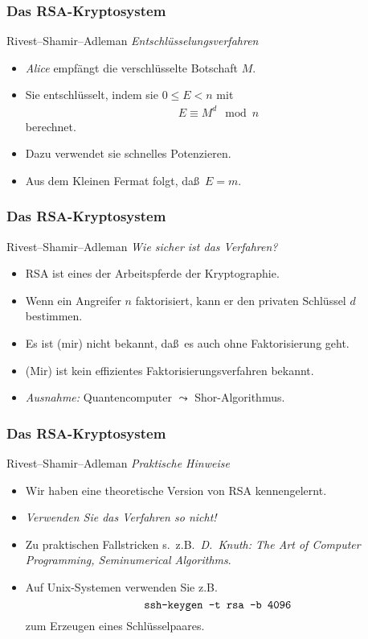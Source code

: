 \documentclass{beamer}
\renewcommand{\emph}[1]{{\textcolor{solarizedRed}{\itshape #1}}}
\renewcommand{\ae}{\"a}
\newcommand{\ue}{\"u}
\newcommand{\mytitle}{Das RSA-Kryptosystem}
\begin{document}
\begin{frame}\frametitle{\mytitle}
	\begin{block}{Rivest--Shamir--Adleman}
		{\itshape Entschl\ue sselungsverfahren}
		\begin{itemize}
			\item \emph{Alice} empf\ae ngt die verschl\ue sselte Botschaft $M$.
			\item Sie entschl\ue sselt, indem sie $0\leq E<n$ mit
				\begin{align*}
				E\equiv M^d\mod n
				\end{align*}
				berechnet.
			\item Dazu verwendet sie schnelles Potenzieren.
			\item Aus dem \alert{Kleinen Fermat} folgt, da\ss\ $E=m$.
		\end{itemize}
	\end{block}
\end{frame}

\begin{frame}\frametitle{\mytitle}
	\begin{block}{Rivest--Shamir--Adleman}
		{\itshape Wie sicher ist das Verfahren?}
		\begin{itemize}
			\item RSA ist eines der Arbeitspferde der Kryptographie.
			\item Wenn ein Angreifer $n$ faktorisiert, kann er den privaten Schl\ue ssel $d$ bestimmen.
			\item Es ist (mir) nicht bekannt, da\ss\ es auch ohne Faktorisierung geht.
			\item (Mir) ist kein effizientes Faktorisierungsverfahren bekannt.
			\item \emph{Ausnahme:} Quantencomputer $\leadsto$ Shor-Algorithmus.
		\end{itemize}
	\end{block}
\end{frame}

\begin{frame}\frametitle{\mytitle}
	\begin{block}{Rivest--Shamir--Adleman}
		{\itshape Praktische Hinweise}
		\begin{itemize}
			\item Wir haben eine theoretische Version von RSA kennengelernt.
			\item \emph{Verwenden Sie das Verfahren so nicht!}
			\item Zu praktischen Fallstricken s.\ z.B.\ {\itshape D.~Knuth: The Art of Computer Programming, Seminumerical Algorithms}.
			\item Auf Unix-Systemen verwenden Sie z.B.\ $$\mbox{\tt ssh-keygen -t rsa -b 4096}$$
				zum Erzeugen eines Schl\ue sselpaares.
		\end{itemize}
	\end{block}
\end{frame}
\end{document}
